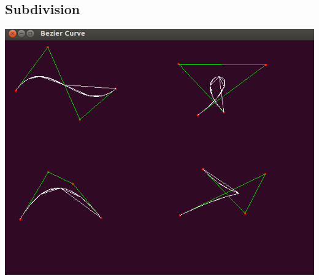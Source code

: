 \documentclass{article}
\begin{document}
\subsection{Subdivision}
\includegraphics[scale=0.4]{subpenis.png}\\
\end{document}
